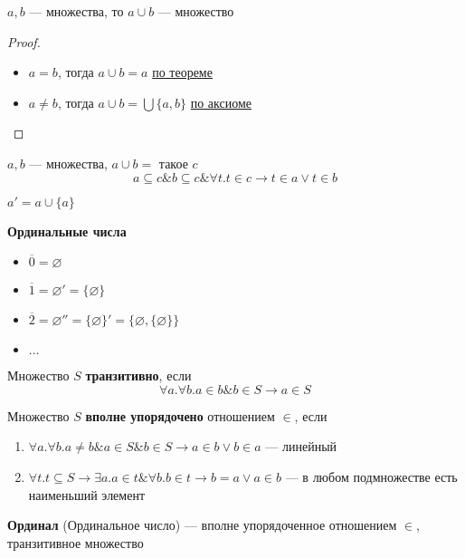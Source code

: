 \documentclass[oneside]{book}
\begin{document}
\begin{theorem}
	\(a, b\) --- множества, то \(a \cup b\) --- множество
\end{theorem}
\begin{proof}
	\-
	\begin{itemize}
		\item \(a = b\), тогда \(a\cup b = a\) \hyperref[orgdc91332]{по теореме}
		\item \(a \neq b\), тогда \(a\cup b = \bigcup\{a, b\}\) \hyperref[orgf21e17e]{по аксиоме}
	\end{itemize}
\end{proof}
\begin{symb}
	\(a, b\) --- множества, \(a \cup b =\) такое \(c\)
	\[ a \subseteq c \& b \subseteq c \& \forall t. t\in c \to t \in a \vee t \in b \]
\end{symb}
\begin{definition}
	\(a' = a \cup \{a\}\)
	\label{org5737a4e}
\end{definition}
\begin{definition}
	\textbf{Ординальные числа}
	\begin{itemize}
		\item \(\overline{0} = \varnothing\)
		\item \(\overline{1} = \varnothing' = \{\varnothing\}\)
		\item \(\overline{2} = \varnothing'' = \{\varnothing\}' = \{\varnothing, \{\varnothing\}\}\)
		\item \(\dots\)
	\end{itemize}
	\label{orgcc0327c}
\end{definition}
\begin{definition}
	Множество \(S\) \textbf{транзитивно}, если
	\[ \forall a. \forall b. a \in b \& b \in S \to a \in S \]
	\label{org93a4df5}
\end{definition}
\begin{definition}
	Множество \(S\) \textbf{вполне упорядочено} отношением \(\in\), если
	\begin{enumerate}
		\item \(\forall a. \forall b. a\neq b\& a \in S \& b \in S \to a \in b \vee b \in a\) --- линейный
		\item \(\forall t. t \subseteq S \to \exists a. a\in t \&\forall b. b \in t \to b = a \vee a \in b\) --- в любом подмножестве есть наименьший элемент
	\end{enumerate}
	\label{orgda893ba}
\end{definition}
\begin{definition}
	\textbf{Ординал} (Ординальное число) --- вполне упорядоченное отношением \(\in\), транзитивное множество
	\label{org70981a4}
\end{definition}
\end{document}
